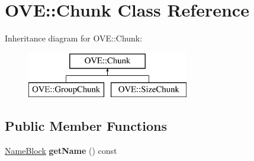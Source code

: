 \hypertarget{class_o_v_e_1_1_chunk}{}\section{O\+VE\+:\+:Chunk Class Reference}
\label{class_o_v_e_1_1_chunk}
Inheritance diagram for O\+VE\+:\+:Chunk\+:\begin{figure}[H]
\begin{center}
\leavevmode
\includegraphics[height=2.000000cm]{class_o_v_e_1_1_chunk}
\end{center}
\end{figure}
\subsection*{Public Member Functions}
\begin{DoxyCompactItemize}
\item 
\mbox{\label{class_o_v_e_1_1_chunk_a0195569da1dcee7576f2de7e89919c2a}} 
\hyperlink{class_o_v_e_1_1_name_block}{Name\+Block} {\bfseries get\+Name} () const
\end{DoxyCompactItemize}

